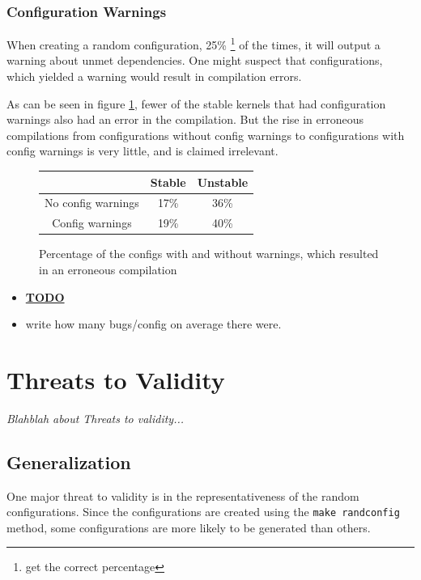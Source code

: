 \documentclass[a4paper,11pt]{report}
\newcommand{\textcode}[1]{
    \fboxsep=1pt
    \texttt{\colorbox{gray!20}{#1}}
}
\newcommand{\figa}{
    \begin{figure}[!htpb]
    \centering
}
\newcommand{\figb}[2]{
    \caption{#1}
    \label{#2}
    \end{figure}
}
\begin{document}
    \subsection{Configuration Warnings}
When creating a random configuration, 25\%
    \footnote{get the correct percentage}
of the times, it will output a warning about unmet dependencies. One might
suspect that configurations, which yielded a warning would result in
compilation errors. 

As can be seen in figure \ref{tbl:confwarns}, fewer of the stable kernels that 
had configuration warnings also had an error in the compilation. But the rise 
in erroneous compilations from configurations without config warnings to 
configurations with config warnings is very little, and is claimed irrelevant.

\figa
    \begin{tabular}{c|c|c}
    \hline
    \hline
        & \textbf{Stable} & \textbf{Unstable} \\
    \hline
    No config warnings & 17\% & 36\%\\
    Config warnings & 19\% & 40\%\\
    \hline
    \hline
    \end{tabular}
\figb{Percentage of the configs with and without warnings, which resulted in an 
    erroneous compilation}{tbl:confwarns}

\begin{itemize}
    \item \underline{\textbf{TODO}}
    \item write how many bugs/config on average there were.
\end{itemize}


\newpage
    \chapter{Threats to Validity}
\label{ch:ttv}

\emph{Blahblah about Threats to validity...}

\section{Generalization}
\label{sec:gen}

One major threat to validity is in the representativeness of the random 
configurations. Since the configurations are created using the \textcode{make 
randconfig} method, some configurations are more likely to be generated than 
others.
\end{document}
